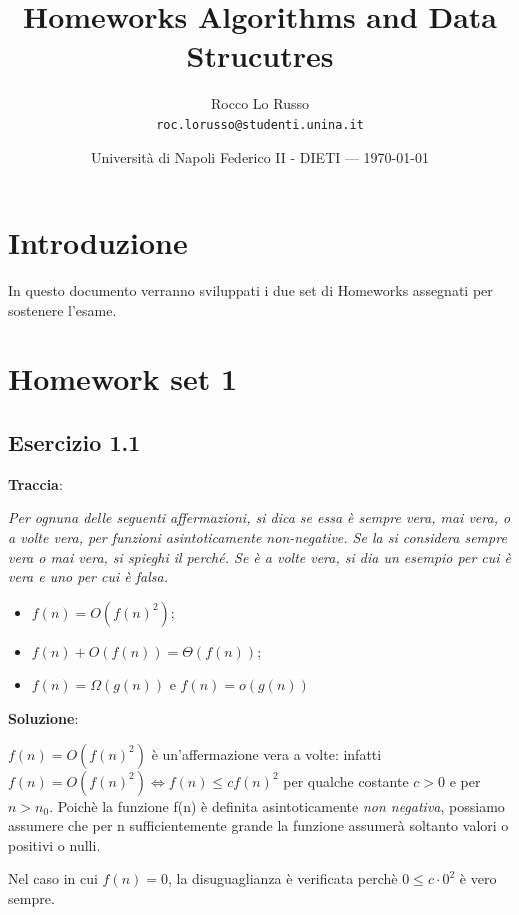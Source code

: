 \documentclass{article}
\title{Homeworks Algorithms and Data Strucutres} %
\author{Rocco Lo Russo\\ \texttt{roc.lorusso@studenti.unina.it}} %
\date{Università di Napoli Federico II - DIETI --- \today} %
\begin{document}
\maketitle %


\section*{Introduzione} %
In questo documento verranno sviluppati i due set di Homeworks assegnati per sostenere l'esame.

\section{Homework set 1} \label{sec:homework_1}%
\subsection{Esercizio 1.1} \label{subsec:esercizio1_1}
\textbf{Traccia}:

\noindent
\textit{Per ognuna delle seguenti affermazioni, si dica se essa è sempre vera, mai vera, o a volte 
vera, per funzioni asintoticamente non-negative. Se la si considera sempre vera o mai vera, 
si spieghi il perché. Se è a volte vera, si dia un esempio per cui è vera e uno per cui è falsa.}
\begin{itemize}
    \item $f(n) = O(f(n)^2)$;
    \item $f(n) + O(f(n)) =  \Theta(f(n))$;
    \item $ f(n) = \Omega(g(n))$ e $f(n) = o(g(n))$
\end{itemize}
\vspace{\baselineskip}

\noindent
\textbf{Soluzione}: 

\noindent
$f(n) = O(f(n)^2) $ è un'affermazione vera a volte: infatti $f(n) = O(f(n)^2) \iff f(n) \le cf(n)^2 $ per qualche costante $ c>0 $ e per $n > n_0$. Poichè la funzione f(n) è definita asintoticamente \textit{non negativa}, possiamo assumere che per n sufficientemente grande la funzione assumerà soltanto valori o positivi o nulli. 

\noindent
Nel caso in cui $f(n) = 0$, la disuguaglianza è verificata perchè $ 0 \le c \cdot 0^2$ è vero sempre. 
\end{document}
